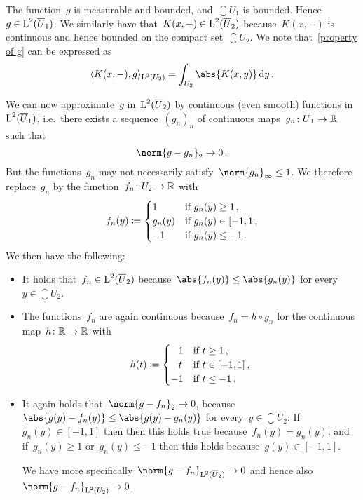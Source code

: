 The function~$g$ is measurable and bounded, and~$\closure{U}_1$ is bounded.
Hence~$g \in \operatorname{L}^2(\overline{U}_1)$.
We similarly have that~$K(x,-) \in \operatorname{L}^2(\overline{U}_2)$ because~$K(x,-)$ is continuous and hence bounded on the compact set~$\closure{U}_2$.
We note that~\eqref{property of g} can be expressed as
\[
    \bil{ K(x,-), g }_{\Lp^2(U_2)}
  = \int_{U_2} \abs{K(x,y)} \dd{y} \,.
\]

We can now approximate~$g$ in~$\operatorname{L}^2(\overline{U}_2)$ by continuous (even smooth) functions in~$\operatorname{L}^2(\overline{U}_1)$, i.e.\ there exists a sequence~$(g_n)_n$ of continuous maps~$g_n \colon \overline{U}_1 \to \mathbb{R}$ such that
\[
  \norm{g - g_n}_2 \to 0 \,.
\]
But the functions~$g_n$ may not necessarily satisfy~$\norm{g_n}_\infty \leq 1$.
We therefore replace~$g_n$ by the function~$f_n \colon U_2 \to \mathbb{R}$ with
\[
            f_n(y)
  \coloneqq  \begin{cases}
              1       & \text{if~$g_n(y) \geq 1$} \,, \\
              g_n(y)  & \text{if~$g_n(y) \in [-1,1$}  \,, \\
              -1      & \text{if~$g_n(y) \leq -1$}  \,.
            \end{cases}
\]
We then have the following:
\begin{itemize}
  \item
    It holds that~$f_n \in \operatorname{L}^2(\overline{U}_2)$ because~$\abs{f_n(y)} \leq \abs{g_n(y)}$ for every~$y \in \closure{U}_2$.
  \item
    The functions~$f_n$ are again continuous because~$f_n = h \circ g_n$ for the continuous map~$h \colon \mathbb{R} \to \mathbb{R}$ with
    \[
                h(t)
      \coloneqq  \begin{cases}
                  \phantom{-}1  & \text{if~$t \geq 1$}  \,, \\
                  \phantom{-}t  & \text{if~$t \in [-1,1]$}  \,, \\
                            -1  & \text{if~$t \leq -1$} \,.
                \end{cases}
    \]
  \item
    It again holds that~$\norm{g - f_n}_2 \to 0$, because~$\abs{g(y) - f_n(y)} \leq \abs{g(y) - g_n(y)}$ for every~$y \in \closure{U}_2$:
    If~$g_n(y) \in [-1,1]$ then then this holds true because~$f_n(y) = g_n(y)$; and if~$g_n(y) \geq 1$ or~$g_n(y) \leq -1$ then this holds because~$g(y) \in [-1,1]$.
    
    We have more specifically~$\norm{g - f_n}_{\Lp^2(\closure{U}_2)} \to 0$ and hence also~$\norm{g - f_n}_{\Lp^2(U_2)} \to 0$.
\end{itemize}


